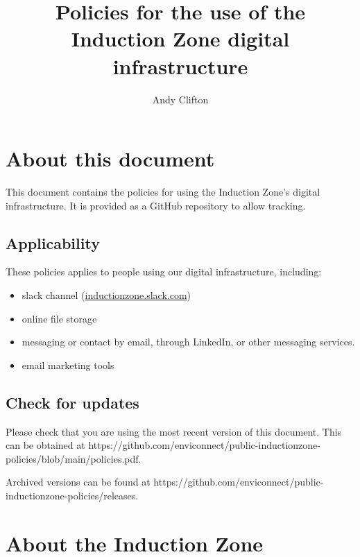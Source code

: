 \documentclass[
  10pt,
  a4paper,
]{article}
\title{Policies for the use of the Induction Zone digital
infrastructure}
\author{Andy Clifton}
\date{}
\providecommand{\tightlist}{%
  \setlength{\itemsep}{0pt}\setlength{\parskip}{0pt}}
\begin{document}
\maketitle

{
\setcounter{tocdepth}{1}
\tableofcontents
}
\hypertarget{about-this-document}{%
\section{About this document}\label{about-this-document}}

This document contains the policies for using the Induction Zone's
digital infrastructure. It is provided as a GitHub repository to allow
tracking.

\hypertarget{applicability}{%
\subsection{Applicability}\label{applicability}}

These policies applies to people using our digital infrastructure,
including:

\begin{itemize}
\tightlist
\item
  slack channel (\url{inductionzone.slack.com})
\item
  online file storage
\item
  messaging or contact by email, through LinkedIn, or other messaging
  services.
\item
  email marketing tools
\end{itemize}

\hypertarget{check-for-updates}{%
\subsection{Check for updates}\label{check-for-updates}}

Please check that you are using the most recent version of this
document. This can be obtained at
https://github.com/enviconnect/public-inductionzone-policies/blob/main/policies.pdf.

Archived versions can be found at
https://github.com/enviconnect/public-inductionzone-policies/releases.

\hypertarget{about-the-induction-zone}{%
\section{About the Induction Zone}\label{about-the-induction-zone}}
\end{document}
